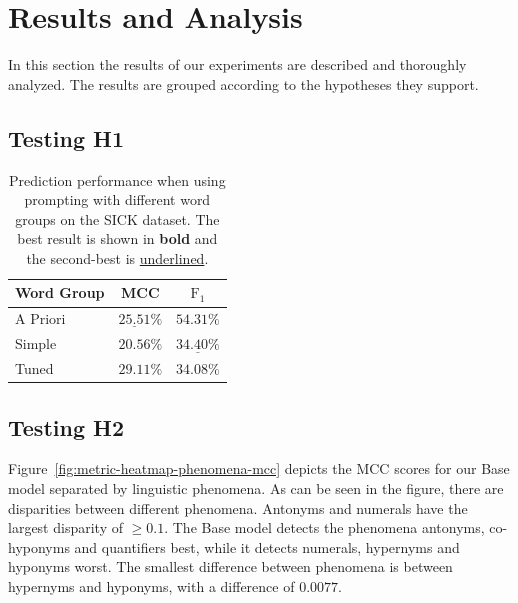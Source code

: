 \section{Results and Analysis} \label{sec:results}
In this section the results of our experiments are described and thoroughly analyzed. The results are grouped according to the hypotheses they support.

\subsection{Testing H1}

\begin{table}[ht!]
    \centering
    \caption{Prediction performance when using prompting with different word groups on the \acs{SICK} dataset. The best result is shown in \textbf{bold} and the second-best is \underline{underlined}.}
    \begin{tabular}{l c c}
        \toprule
        \multicolumn{1}{c}{Word Group} & \acs{MCC} & $\text{F}_1$ \\
        \midrule
        A Priori & $\underline{25.51}\%$ & $\mathbf{54.31\%}$ \\
        Simple & $20.56\%$ & $\underline{34.40\%}$ \\
        Tuned & $\mathbf{29.11\%}$ & $34.08\%$ \\
        \bottomrule
    \end{tabular}
\end{table}

\subsection{Testing H2}
Figure~\ref{fig:metric-heatmap-phenomena-mcc} depicts the \acs{MCC} scores for our Base model separated by linguistic phenomena. As can be seen in the figure, there are disparities between different phenomena. Antonyms and numerals have the largest disparity of $\geq 0.1$. The Base model detects the phenomena antonyms, co-hyponyms and quantifiers best, while it detects numerals, hypernyms and hyponyms worst. The smallest difference between phenomena is between hypernyms and hyponyms, with a difference of $0.0077$.

